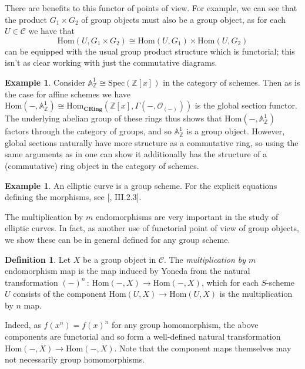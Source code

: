 \documentclass{article}
\theoremstyle{definition}
\newtheorem{definition}[theorem]{Definition}
\newtheorem{example}[theorem]{Example}
\theoremstyle{remark}
\theoremstyle{plain}
\newcommand{\Z}{\mathbb{Z}}
\newcommand{\mb}[1]{\mathbb{#1}}
\newcommand{\mc}[1]{\mathcal{#1}}
\begin{document}
There are benefits to this functor of points of view. For example, we can see that the product $G_1 \times G_2$ of group objects must also be a group object, as for each $U \in \mc{C}$ we have that 
\[\text{Hom}(U, G_1 \times G_2) \cong \text{Hom}(U,G_1) \times \text{Hom}(U, G_2)\]
can be equipped with the usual group product structure which is functorial; this isn't as clear working with just the commutative diagrams.

\begin{example}
	Consider $\mb{A}_{\Z}^1 \cong \text{Spec}(\Z[x])$ in the category of schemes.
	Then as is the case for affine schemes we have $\text{Hom}(-, \mb{A}_{\Z}^1) \cong \text{Hom}_{\textbf{CRing}}(\Z[x], \Gamma(-, \mc{O}_{(-)}))$ is the global section functor.
	The underlying abelian group of these rings thus shows that $\text{Hom}(-, \mb{A}_{\Z}^1)$ factors through the category of groups, and so $\mb{A}_{\Z}^1$ is a group object.
	However, global sections naturally have more structure as a commutative ring, so using the same arguments as in  one can show it additionally has the structure of a (commutative) ring object in the category of schemes. 
\end{example}


\begin{example}
	An elliptic curve is a group scheme.
	For the explicit equations defining the morphisms, see [\cite{AEC1}, III.2.3].
\end{example}


The multiplication by $m$ endomorphisms are very important in the study of elliptic curves. 
In fact, as another use of functorial point of view of group objects, we show these can be in general defined for any group scheme.

\begin{definition}
	Let $X$ be a group object in $\mc{C}$.
	The \textit{multiplication by $m$} endomorphism map is the map induced by Yoneda from the natural transformation $(-)^n \,:\, \text{Hom}(-,X) \to \text{Hom}(-,X)$, which for each $S$-scheme $U$ consists of  the component $\text{Hom}(U,X) \to \text{Hom}(U,X)$ is the multiplication by $n$ map.
\end{definition}

Indeed, as $f(x^n) = f(x)^n$ for any group homomorphism, the above components are functorial and so form a well-defined natural transformation $\text{Hom}(-,X) \to \text{Hom}(-,X)$.
Note that the component maps themselves may not necessarily group homomorphisms. \newline
\end{document}
